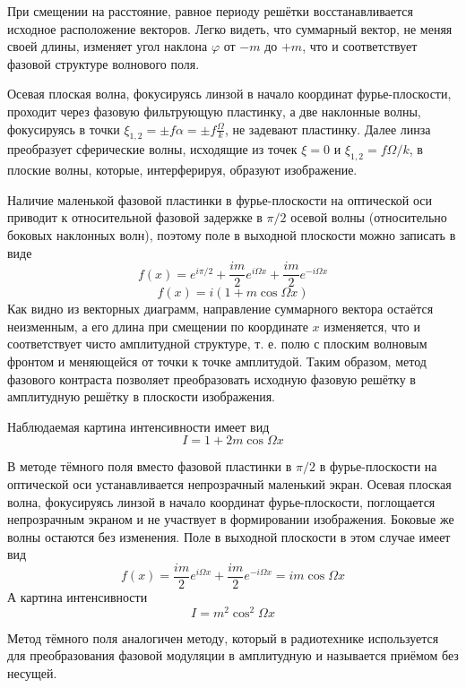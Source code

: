 \begin{figure}[ht!]
\end{figure}

При смещении на расстояние, равное периоду решётки восстанавливается исходное расположение векторов.
 Легко  видеть, что суммарный вектор, не меняя своей длины, изменяет угол наклона
 $\varphi$ от $-m$ до $+m$, что и соответствует фазовой структуре волнового поля.

Осевая плоская волна, фокусируясь линзой в начало координат
фурье-плоскости, проходит через фазовую фильтрующую пластинку, а две наклонные волны, фокусируясь в точки
$\xi_{1,2} = \pm f\alpha = \pm f\frac{\Omega}{k}$, не задевают пластинку.
Далее линза преобразует сферические волны, исходящие из точек
$\xi = 0$ и $\xi_{1,2} = f\Omega/k$, в плоские волны, которые, интерферируя, образуют изображение.

Наличие маленькой фазовой пластинки в фурье-плоскости на оптической оси приводит к относительной фазовой задержке в
$\pi/2$ осевой волны (относительно боковых наклонных волн), поэтому поле в выходной плоскости можно записать в виде
\[
f(x) = e^{i\pi/2} + \frac{im}{2}e^{i\Omega x} + \frac{im}{2}e^{-i\Omega x}
\]
\[
f(x) = i\left(1 + m\cos\Omega x\right)
\]
Как видно из векторных диаграмм, направление суммарного вектора остаётся неизменным, а его длина при смещении по координате
$x$ изменяется, что и соответствует чисто амплитудной структуре, т. е.
полю с плоским волновым фронтом и меняющейся от точки к точке
амплитудой. Таким образом, метод фазового контраста позволяет преобразовать исходную фазовую решётку в амплитудную решётку в плоскости изображения.

Наблюдаемая картина интенсивности имеет вид
\[
I = 1 + 2m\cos\Omega x
\]

В методе тёмного поля вместо фазовой пластинки в $\pi / 2$ в фурье-плоскости на оптической оси устанавливается непрозрачный маленький экран. Осевая плоская волна, фокусируясь линзой в начало
координат фурье-плоскости, поглощается непрозрачным экраном и не
участвует в формировании изображения. Боковые же волны остаются
без изменения. Поле в выходной плоскости в этом случае имеет вид
\[
f(x) = \frac{im}{2}e^{i\Omega x} + \frac{im}{2}e^{-i\Omega x} = im\cos\Omega x
\]
А картина интенсивности
\[
I = m^2 \cos^2 \Omega x
\]

Метод тёмного поля аналогичен методу, который в радиотехнике
используется для преобразования фазовой модуляции в амплитудную
и называется приёмом без несущей.
